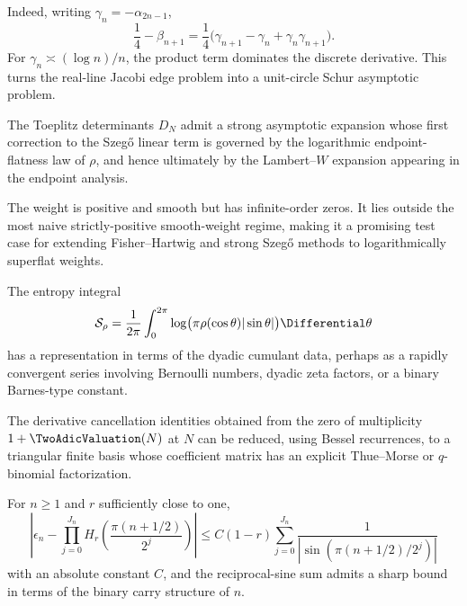 \documentclass[11pt]{article}
\theoremstyle{definition}
\theoremstyle{remark}
\begin{document}
Indeed, writing \(\gamma_n=-\alpha_{2n-1}\),
\[
 \frac14-\beta_{n+1}
 =\frac14\bigl(\gamma_{n+1}-\gamma_n+\gamma_n\gamma_{n+1}\bigr).
\]
For \(\gamma_n\asymp(\log n)/n\), the product term dominates the discrete derivative.
This turns the real-line Jacobi edge problem into a unit-circle Schur asymptotic problem.

\begin{conjecture}
\label{p7:conj:Toeplitz}
The Toeplitz determinants \(D_N\) admit a strong asymptotic expansion whose first correction
to the Szeg\H{o} linear term is governed by the logarithmic endpoint-flatness law of
\(\rho\), and hence ultimately by the Lambert--\(W\) expansion appearing in the endpoint
analysis.
\end{conjecture}

The weight is positive and smooth but has infinite-order zeros. It lies outside the most
naive strictly-positive smooth-weight regime, making it a promising test case for extending
Fisher--Hartwig and strong Szeg\H{o} methods to logarithmically superflat weights.

\begin{conjecture}
\label{p7:conj:Szego-constant}
The entropy integral
\begin{equation}
 \mathcal S_\rho=\frac1{2\pi}\int_0^{2\pi}
 \log\bigl(\pi\rho(\cos\theta)|\sin\theta|\bigr)\Differential\theta
 \label{p7:eq:Szego-constant}
\end{equation}
has a representation in terms of the dyadic cumulant data, perhaps as a rapidly convergent
series involving Bernoulli numbers, dyadic zeta factors, or a binary Barnes-type constant.
\end{conjecture}

\begin{conjecture}
\label{p7:conj:Bessel-basis}
The derivative cancellation identities obtained from the zero of multiplicity
\(1+\TwoAdicValuation(N)\) at \(N\) can be reduced, using Bessel recurrences, to a triangular finite
basis whose coefficient matrix has an explicit Thue--Morse or \(q\)-binomial factorization.
\end{conjecture}

\begin{conjecture}
\label{p7:conj:Abel-rate}
For \(n\ge1\) and \(r\) sufficiently close to one,
\begin{equation}
 \left|\epsilon_n-\prod_{j=0}^{J_n}H_r\!\left(
 \frac{\pi(n+1/2)}{2^j}\right)\right|
 \le C(1-r)\sum_{j=0}^{J_n}\frac{1}{|\sin(\pi(n+1/2)/2^j)|}
 \label{p7:eq:Abel-rate}
\end{equation}
with an absolute constant \(C\), and the reciprocal-sine sum admits a sharp bound in terms
of the binary carry structure of \(n\).
\end{conjecture}
\end{document}
